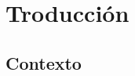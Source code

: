 \documentclass{subfiles}
\begin{document}
  \chapter{Troducción}
  \label{chap:2}

    \section{Contexto}
    \label{sec:2.1}

      \paragraph{}
      \lipsum[1]
      
      \paragraph{}
      \lipsum[2]
      
      \paragraph{}
      \lipsum[3]
      
      \paragraph{}
      \lipsum[4]
      
      \paragraph{}
      \lipsum[5]
      
      \paragraph{}
      \lipsum[6]
      
      \paragraph{}
      \lipsum[7]
\end{document}
